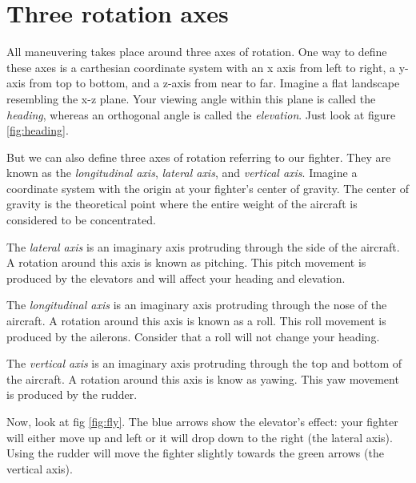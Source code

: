 \section{Three rotation axes}
\label{sec:axis}

All maneuvering takes place around three axes of rotation.
One way to define these axes is a carthesian coordinate system
with an x axis from left to right,
a y-axis from top to bottom, and a z-axis from near to far.
Imagine a flat landscape resembling the x-z plane.
Your viewing angle within this plane is called the \textit{heading},
whereas an orthogonal angle is called the \textit{elevation}.
Just look at figure \ref{fig:heading}.

But we can also define three axes of rotation referring to our fighter.
They are known as the \textit{longitudinal axis}, \textit{lateral axis},
and \textit{vertical axis}.
Imagine a coordinate system with the origin at your fighter's center of gravity.
The center of gravity is the theoretical point where the entire weight
of the aircraft is considered to be concentrated.

The \textit{lateral axis} is an imaginary axis protruding through the side
of the aircraft. A rotation around this axis is known as pitching.
This pitch movement is produced by the elevators and
will affect your heading and elevation.

The \textit{longitudinal axis} is an imaginary axis protruding through
the nose of the aircraft.
A rotation around this axis is known as a roll.
This roll movement is produced by the ailerons.
Consider that a roll will not change your heading.

The \textit{vertical axis} is an imaginary axis protruding through the top and
bottom
of the aircraft. A rotation around this axis is know as yawing.
This yaw movement is produced by the rudder.

Now, look at fig \ref{fig:fly}.
The blue arrows show the elevator's effect: your fighter will
either move up and left or it will drop down to the right
(the lateral axis).
Using the rudder will move the fighter slightly towards the green arrows
(the vertical axis).

